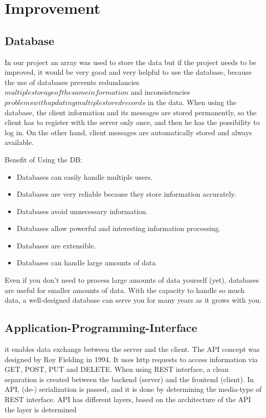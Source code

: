 \chapter{Improvement}\label{ch:improvement}


\section{Database}\label{sec:database}
In our project an array was used to store the data
but if the project needs to be improved, it would be very good and very helpful to use the database,
because the use of databases prevents redundancies \(multiple storage of the same information\) and
inconsistencies \(problems with updating multiple stored records\) in the data.
When using the database, the client information and its messages are stored permanently, so the
client has to register with the server only once, and then he has the possibility to log in.
On the other hand, client messages are automatically stored and always available.

Benefit of Using the DB:
\begin{itemize}
    \item Databases can easily handle multiple users.
    \item Databases are very reliable because they store information accurately.
    \item Databases avoid unnecessary information.
    \item Databases allow powerful and interesting information processing.
    \item Databases are extensible.
    \item Databases can handle large amounts of data
\end{itemize}
\noindent
Even if you don't need to process large amounts of data yourself (yet), databases are useful for
smaller amounts of data. With the capacity to handle so much data, a well-designed database can
serve you for many years as it grows with you.


\section{Application-Programming-Interface}\label{sec:application-programming-interface}
it enables data exchange between the server and the client. The API concept was designed by Roy
Fielding in 1994.
It uses http requests to access information via GET, POST, PUT and DELETE\@.
When using REST interface, a clean separation is created between the backend (server) and the
frontend (client).
In API, (de-) serialization is passed, and it is done by determining the media-type of REST interface.
API has different layers, based on the architecture of the API the layer is determined

